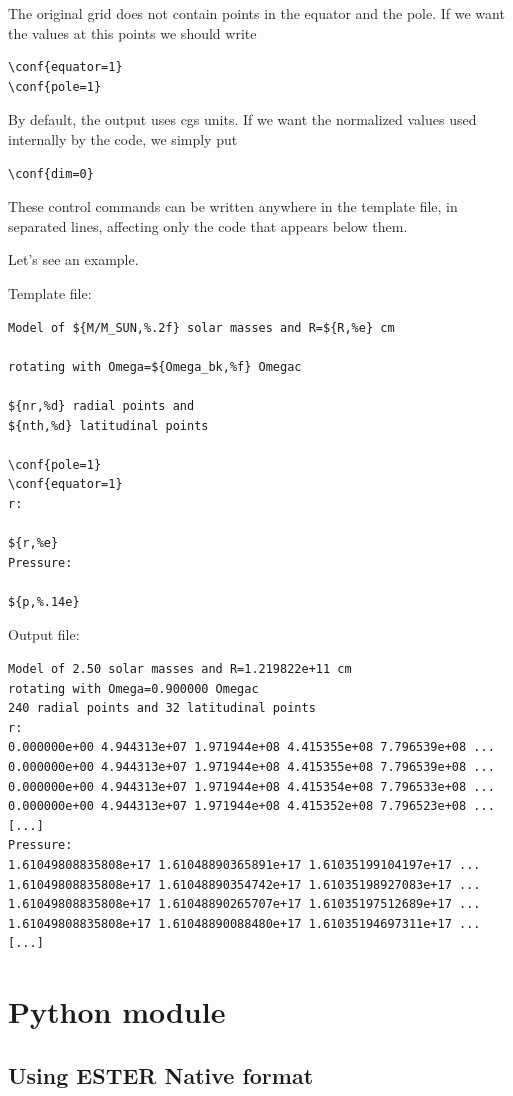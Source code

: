 The original grid  does not contain points in the equator and the pole. If we want the values
at this points we should write
\begin{verbatim}
\conf{equator=1}
\conf{pole=1}
\end{verbatim}

By default, the output uses cgs units. If we want the normalized values used internally by
the code, we simply put
\begin{verbatim}
\conf{dim=0}
\end{verbatim}

These control commands can be written anywhere in the template file, in separated lines, 
affecting only the code that appears below them.

Let's see an example.

Template file:
\begin{verbatim}
Model of ${M/M_SUN,%.2f} solar masses and R=${R,%e} cm

rotating with Omega=${Omega_bk,%f} Omegac

${nr,%d} radial points and 
${nth,%d} latitudinal points

\conf{pole=1}
\conf{equator=1}
r:

${r,%e}
Pressure:

${p,%.14e}

\end{verbatim} 

Output file:
\begin{verbatim}
Model of 2.50 solar masses and R=1.219822e+11 cm
rotating with Omega=0.900000 Omegac
240 radial points and 32 latitudinal points
r:
0.000000e+00 4.944313e+07 1.971944e+08 4.415355e+08 7.796539e+08 ...
0.000000e+00 4.944313e+07 1.971944e+08 4.415355e+08 7.796539e+08 ...
0.000000e+00 4.944313e+07 1.971944e+08 4.415354e+08 7.796533e+08 ...
0.000000e+00 4.944313e+07 1.971944e+08 4.415352e+08 7.796523e+08 ...
[...]
Pressure:
1.61049808835808e+17 1.61048890365891e+17 1.61035199104197e+17 ...
1.61049808835808e+17 1.61048890354742e+17 1.61035198927083e+17 ...
1.61049808835808e+17 1.61048890265707e+17 1.61035197512689e+17 ...
1.61049808835808e+17 1.61048890088480e+17 1.61035194697311e+17 ...
[...]
\end{verbatim} 


\section{Python module}

\subsection{Using ESTER Native format}

